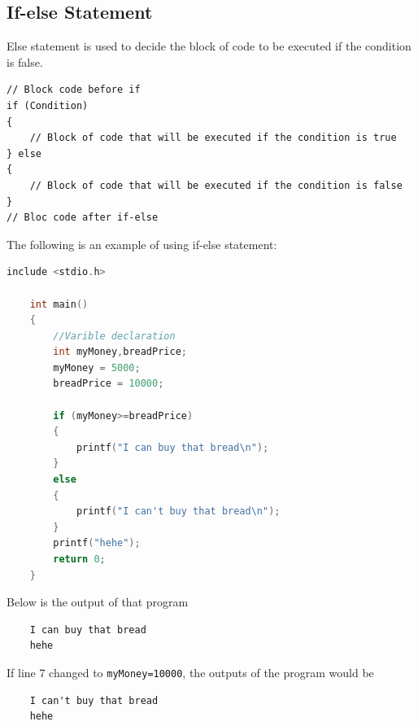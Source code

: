 \subsection{If-else Statement}
Else statement is used to decide the block of code to be executed if the condition is false.
\begin{verbatim}
// Block code before if
if (Condition) 
{
	// Block of code that will be executed if the condition is true
} else
{
	// Block of code that will be executed if the condition is false
}
// Bloc code after if-else
\end{verbatim}
The following is an example of using if-else statement:
\begin{lstlisting}[language=c,caption = If-else example,label=lst:ifelseexample01]
	include <stdio.h>
	
	int main()
	{
		//Varible declaration
		int myMoney,breadPrice;
		myMoney = 5000;
		breadPrice = 10000;
		
		if (myMoney>=breadPrice)
		{
		    printf("I can buy that bread\n");
		}
		else
		{
	        printf("I can't buy that bread\n");	
		}
		printf("hehe");
		return 0;
	}
\end{lstlisting}
Below is the output of that program
\begin{verbatim}
    I can buy that bread
    hehe
\end{verbatim}
If line 7 changed to \verb|myMoney=10000|, the outputs of the program would be
\begin{verbatim}
    I can't buy that bread
    hehe
\end{verbatim}

